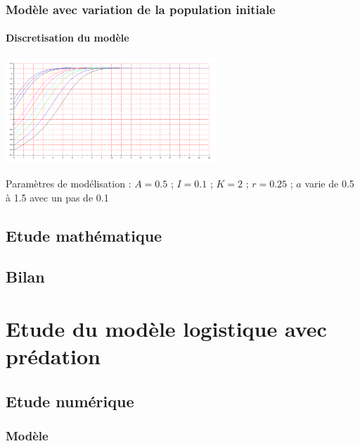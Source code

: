 \documentclass{article}
\begin{document}
\subsubsection{Modèle avec variation de la population initiale}

\paragraph{Discretisation du modèle}
\begin{center}
\includegraphics[width=300px]{img/part1/TrajPop.png}
\end{center}
Paramètres de modélisation : $A=0.5$ ; $I=0.1$ ; $K=2$ ; $r=0.25$  ; $a$ varie de 0.5 à 1.5 avec un pas de 0.1
\paragraph{}

\newpage

\subsection{Etude mathématique}


\subsection{Bilan}
\paragraph{}

\newpage
\section{Etude du modèle logistique avec prédation}

\subsection{Etude numérique}

\subsubsection{Modèle}
\end{document}
